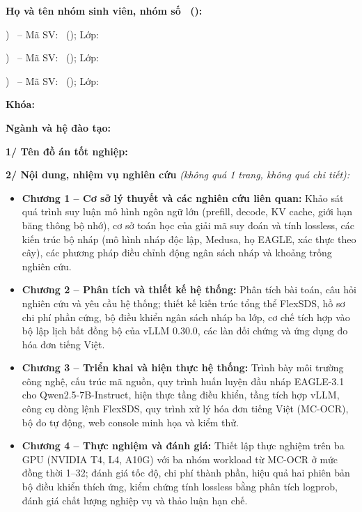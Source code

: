{\fontsize{12.5}{16}\selectfont
\noindent\textbf{Họ và tên nhóm sinh viên, nhóm số \SoNhom\ (\TenNhom):}\par
{}) \TenSinhVien\ -- Mã SV: \MaSinhVien\ (\VaiTroSinhVienMot); Lớp: \LopSinhVien\par
{}) \TenSinhVienHai\ -- Mã SV: \MaSinhVienHai\ (\VaiTroSinhVienHai); Lớp: \LopSinhVien\par
{}) \TenSinhVienBa\ -- Mã SV: \MaSinhVienBa\ (\VaiTroSinhVienBa); Lớp: \LopSinhVien\par
\smallskip
\noindent\textbf{Khóa:} \KhoaHoc\par
\noindent\textbf{Ngành và hệ đào tạo:} \HeDaoTao\par
\smallskip
\noindent\textbf{1/ Tên đồ án tốt nghiệp:} \TenDeTai\par
\smallskip
\noindent\textbf{2/ Nội dung, nhiệm vụ nghiên cứu} \textit{(không quá 1 trang, không quá chi tiết):}
\begin{itemize}
 \setlength{\itemsep}{2pt}
 \setlength{\parskip}{0pt}
 \item \textbf{Chương 1 -- Cơ sở lý thuyết và các nghiên cứu liên quan:} Khảo sát quá trình suy luận mô hình ngôn ngữ lớn (prefill, decode, KV cache, giới hạn băng thông bộ nhớ), cơ sở toán học của giải mã suy đoán và tính lossless, các kiến trúc bộ nháp (mô hình nháp độc lập, Medusa, họ EAGLE, xác thực theo cây), các phương pháp điều chỉnh động ngân sách nháp và khoảng trống nghiên cứu.
 \item \textbf{Chương 2 -- Phân tích và thiết kế hệ thống:} Phân tích bài toán, câu hỏi nghiên cứu và yêu cầu hệ thống; thiết kế kiến trúc tổng thể FlexSDS, hồ sơ chi phí phần cứng, bộ điều khiển ngân sách nháp ba lớp, cơ chế tích hợp vào bộ lập lịch bất đồng bộ của vLLM 0.30.0, các làn đối chứng và ứng dụng đo hóa đơn tiếng Việt.
 \item \textbf{Chương 3 -- Triển khai và hiện thực hệ thống:} Trình bày môi trường công nghệ, cấu trúc mã nguồn, quy trình huấn luyện đầu nháp EAGLE-3.1 cho Qwen2.5-7B-Instruct, hiện thực tầng điều khiển, tầng tích hợp vLLM, công cụ dòng lệnh FlexSDS, quy trình xử lý hóa đơn tiếng Việt (MC-OCR), bộ đo tự động, web console minh họa và kiểm thử.
 \item \textbf{Chương 4 -- Thực nghiệm và đánh giá:} Thiết lập thực nghiệm trên ba GPU (NVIDIA T4, L4, A10G) với ba nhóm workload từ MC-OCR ở mức đồng thời 1--32; đánh giá tốc độ, chi phí thành phần, hiệu quả hai phiên bản bộ điều khiển thích ứng, kiểm chứng tính lossless bằng phân tích logprob, đánh giá chất lượng nghiệp vụ và thảo luận hạn chế.

\end{itemize}}
